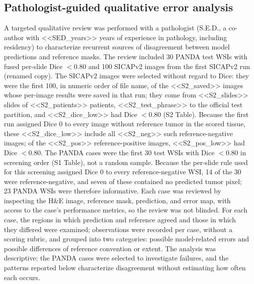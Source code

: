 \documentclass[10pt,letterpaper]{article}
\begin{document}
\subsection*{Pathologist-guided qualitative error analysis}
A targeted qualitative review was performed with a pathologist (S.E.D., a co-author with <<SED_years>> years of experience in pathology, including residency) to characterize recurrent sources of disagreement between model predictions and reference masks. The review included 30 PANDA test WSIs with fused per-slide Dice $<0.80$ and 100 SICAPv2 images from the first SICAPv2 run (renamed copy). The SICAPv2 images were selected without regard to Dice: they were the first 100, in numeric order of file name, of the <<S2_saved>> images whose per-image results were saved in that run; they come from <<S2_slides>> slides of <<S2_patients>> patients, <<S2_test_phrase>> to the official test partition, and <<S2_dice_low>> had Dice $<0.80$ (S2 Table). Because the first run assigned Dice 0 to every image without reference tumor in the scored tissue, these <<S2_dice_low>> include all <<S2_neg>> such reference-negative images; of the <<S2_pos>> reference-positive images, <<S2_pos_low>> had Dice $<0.80$. The PANDA cases were the first 30 test WSIs with Dice $<0.80$ in screening order (S1 Table), not a random sample. Because the per-slide rule used for this screening assigned Dice 0 to every reference-negative WSI, 14 of the 30 were reference-negative, and seven of these contained no predicted tumor pixel; 23 PANDA WSIs were therefore informative. Each case was reviewed by inspecting the H\&E image, reference mask, prediction, and error map, with access to the case's performance metrics, so the review was not blinded. For each case, the regions in which prediction and reference agreed and those in which they differed were examined; observations were recorded per case, without a scoring rubric, and grouped into two categories: possible model-related errors and possible differences of reference convention or extent. The analysis was descriptive: the PANDA cases were selected to investigate failures, and the patterns reported below characterize disagreement without estimating how often each occurs.
\end{document}
